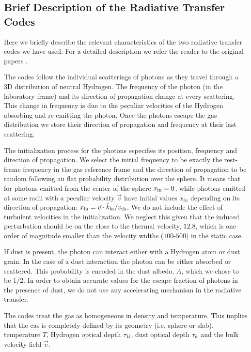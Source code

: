 \documentclass{emulateapj}
\newcommand{\ly}{{\ifmmode{{\rm Ly}\alpha~}\else{Ly$\alpha$~}\fi}}
\newcommand{\kms}{{\ifmmode{{\mathrm{\,km\ s}^{-1}}}\else{\,km~s$^{-1}$}\fi}}
\begin{document}
\subsection{Brief Description of the Radiative Transfer Codes}

Here we briefly describe the relevant characteristics of the two
radiative transfer codes we have used.  
For a detailed description we refer the reader to the original papers
\cite{CLARA,DijkstraKramer}. 

The codes follow the individual scatterings of \ly photons as they
travel through a 3D distribution of neutral Hydrogen. 
The frequency of the photon (in the laboratory frame) and
its direction of propagation change at every scattering. 
This change in frequency is due to the peculiar velocities of the
Hydrogen absorbing and re-emitting the photon. 
Once the photons escape the gas distribution we store their direction of
propagation and frequency at their last scattering.

The initialization process for the \ly photons especifies its
position, frequency and direction of propagation. 
We select the initial frequency to be exactly the \ly rest-frame
frequency in the gas reference frame and the direction of propagation
to be random following an flat probability distribution over the sphere.  
It means that for photons emitted from the center of the sphere
$x_{\rm in}=0$, while photons emitted at some radii with a peculiar
velocity $\vec{v}$ have initial values $x_{in}$ depending on its direction of
propagation: $x_{\rm   in}=\vec{v}\cdot\hat{k}_{\rm in}/v_{\rm th}$.
We do not include the effect of turbulent velocities in the
initialization.
We neglect this given that the induced perturbation should be on the
close to the thermal velocity, $12.8$\kms, which is one order of
magnitude smaller than the velocity widths ($100$-$500$\kms) in the
static case. 


If dust is present, the photon can interact either with a Hydrogen
atom or dust grain.
In the case of a dust interaction the photon can be either absorbed or
scattered.
This probability is encoded in the dust albedo, $A$, which we chose
to be $1/2$. 
In order to obtain accurate values for the escape fraction of
photons in the presence of dust, we do not use any accelerating
mechanism in the radiative transfer. 


The codes treat the gas as homogeneous in density and temperature.  
This implies that the cas is completely defined by its geometry
(i.e. sphere or slab), temperature $T$, Hydrogen optical depth
$\tau_{\rm H}$, dust optical depth $\tau_{\rm a}$ and the bulk
velocity field $\vec{v}$.  
\end{document}
